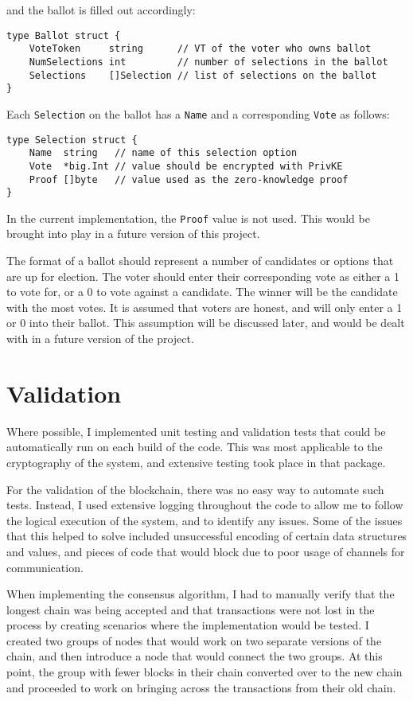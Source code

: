 \documentclass[a4paper,12pt]{article}
\begin{document}
and the ballot is filled out accordingly:
\begin{Verbatim}[obeytabs,tabsize=4]
type Ballot struct {
	VoteToken     string      // VT of the voter who owns ballot
	NumSelections int         // number of selections in the ballot
	Selections    []Selection // list of selections on the ballot
}
\end{Verbatim}

Each \verb|Selection| on the ballot has a \verb|Name| and a corresponding \verb|Vote| as follows:
\begin{Verbatim}[obeytabs,tabsize=4]
type Selection struct {
	Name  string   // name of this selection option
	Vote  *big.Int // value should be encrypted with PrivKE
	Proof []byte   // value used as the zero-knowledge proof
}
\end{Verbatim}

In the current implementation, the \verb|Proof| value is not used. This would be brought into play in a future version of this project.

The format of a ballot should represent a number of candidates or options that are up for election. The voter should enter their corresponding vote as either a 1 to vote for, or a 0 to vote against a candidate. The winner will be the candidate with the most votes. It is assumed that voters are honest, and will only enter a 1 or 0 into their ballot. This assumption will be discussed later, and would be dealt with in a future version of the project.

\section{Validation}
Where possible, I implemented unit testing and validation tests that could be automatically run on each build of the code. This was most applicable to the cryptography of the system, and extensive testing took place in that package.

For the validation of the blockchain, there was no easy way to automate such tests. Instead, I used extensive logging throughout the code to allow me to follow the logical execution of the system, and to identify any issues. Some of the issues that this helped to solve included unsuccessful encoding of certain data structures and values, and pieces of code that would block due to poor usage of channels for communication.

When implementing the consensus algorithm, I had to manually verify that the longest chain was being accepted and that transactions were not lost in the process by creating scenarios where the implementation would be tested. I created two groups of nodes that would work on two separate versions of the chain, and then introduce a node that would connect the two groups. At this point, the group with fewer blocks in their chain converted over to the new chain and proceeded to work on bringing across the transactions from their old chain.
\end{document}
